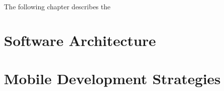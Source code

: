 The following chapter describes the

\section{Software Architecture}


\section{Mobile Development Strategies}


